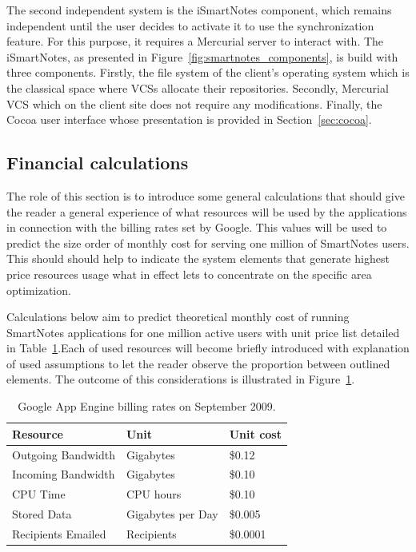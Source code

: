 The second independent system is the iSmartNotes component, which remains independent until the user decides to activate it to use the synchronization feature. For this purpose, it requires a Mercurial server to interact with. The iSmartNotes, as presented in Figure~\ref{fig:smartnotes_components}, is build with three components. Firstly, the file system of the client's operating system which is the classical space where VCSs allocate their repositories. Secondly, Mercurial VCS which on the client site does not require any modifications. Finally, the Cocoa user interface whose presentation is provided in Section~\ref{sec:cocoa}.

\subsection{Financial calculations}\label{subsec:gae_calculations}
The role of this section is to introduce some general calculations that should give the reader a general experience of what resources will be used by the applications in connection with the billing rates set by Google. This values will be used to predict the size order of monthly cost for serving one million of SmartNotes users. This should should help to indicate the system elements that generate highest price resources usage what in effect lets to concentrate on the specific area optimization. 

Calculations below aim to predict theoretical monthly cost of running SmartNotes applications for one million active users with unit price list detailed in Table~\ref{tab:gae_cost}.Each of used resources will become briefly introduced with explanation of used assumptions to let the reader observe the proportion between outlined elements. The outcome of this considerations is illustrated in Figure~\ref{tab:gae_cost}.
\begin{table}[h]
\centering
\caption{Google App Engine billing rates on September 2009.}
\label{tab:gae_cost}
\begin{tabular}{|l|l|l|} \hline \hline
\textbf{Resource} & \textbf{Unit} & \textbf{Unit cost} \\ \hline \hline
Outgoing Bandwidth & Gigabytes & \$0.12 \\ \hline
Incoming Bandwidth & Gigabytes & \$0.10 \\ \hline
CPU Time & CPU hours & \$0.10 \\ \hline
Stored Data & Gigabytes per Day & \$0.005 \\ \hline
Recipients Emailed & Recipients & \$0.0001\\ \hline \hline
\end{tabular}
\end{table}


